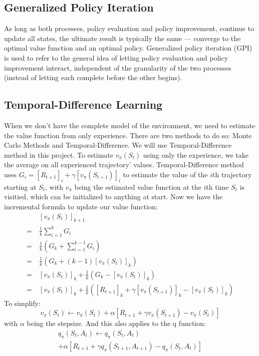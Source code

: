\documentclass[balance,upint,subscriptcorrection,varvw,mathalfa=cal=boondoxo,pdf-a,colorlinks,nofoot]{asmeconf}
\begin{document}
\subsection{Generalized Policy Iteration}
\noindent As long as both processes, policy evaluation and policy improvement,
continue to update all states, the ultimate result is typically the 
same --- converge to the optimal value function and an optimal policy.
\vspace{3mm}\newline Generalized policy iteration (GPI) is used to refer to the
general idea of letting policy evaluation and policy improvement interact,
independent of the granularity of the two processes (instead of letting each
complete before the other begins).

\subsection{Temporal-Difference Learning}
\noindent When we don't have the complete model of the environment, we need to 
estimate the value function from only experience. There are two methods to do 
so: Monte Carlo Methods and Temporal-Difference. We will use 
Temporal-Difference method in this project.
\vspace{3mm}\newline To estimate \(v_\pi(S_t)\) using only the experience, we 
take the average on all experienced trajectory' values. Temporal-Difference
method uses \(G_i = [R_{t+1}]_i+\gamma [v_\pi(S_{t+1})]_i\) to estimate the 
value of the \(i\)th trajectory starting at \(S_t\), with \(v_\pi\) being the 
estimated value function at the \(i\)th time \(S_t\) is visitied, which can be 
initialized to anything at start. Now we have the incremental formula to update
our value function:
\begin{align*}
    &[v_\pi(S_t)]_{k+1} \\
    =\:& \frac{1}{k}\sum_{i=1}^{k} G_i\\
    =\:& \frac{1}{k}\left(G_k + \sum_{i=1}^{k-1} G_i\right)\\
    =\:& \frac{1}{k}\left(G_k + (k-1)[v_\pi(S_t)]_{k}\right)\\
    =\:& [v_\pi(S_t)]_k + \frac{1}{k}(G_k-[v_\pi(S_t)]_k)\\
    =\:& [v_\pi(S_t)]_k + \frac{1}{k}
    ([R_{t+1}]_k+\gamma [v_\pi(S_{t+1})]_k-[v_\pi(S_t)]_k)
\end{align*}
To simplify:
\[v_\pi(S_t)\longleftarrow v_\pi(S_t)+\alpha
[R_{t+1}+\gamma v_\pi(S_{t+1})-v_\pi(S_t)]\]
with \(\alpha\) being the stepsize. And this also applies to the q function:
\begin{multline*}
    q_\pi(S_t, A_t)\longleftarrow q_\pi(S_t, A_t)\\
    +\alpha[R_{t+1}+\gamma q_\pi(S_{t+1}, A_{t+1})-q_\pi(S_t, A_t)]
\end{multline*}
\end{document}
